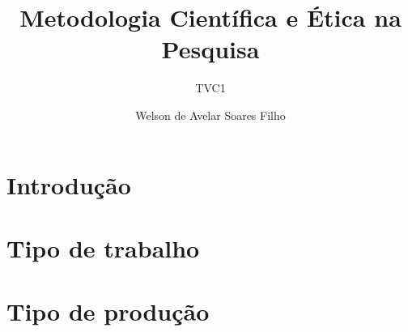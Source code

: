 \documentclass[11pt]{beamer}
\title{Metodologia Científica e Ética na Pesquisa}
\subtitle{TVC1}
\author{Welson de Avelar Soares Filho}
\begin{document}


\section{Introdução}


\section{Tipo de trabalho}


\section{Tipo de produção}


%

%

%

%



%    
%    


\begin{frame}
\titlepage 
\end{frame}
\end{document}
